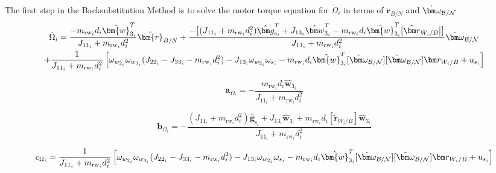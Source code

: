 The first step in the Backsubstitution Method is to solve the motor torque equation for $\dot{\Omega}_i$ in terms of $\ddot{\bm{r}}_{B/N}$ and $\dot{\bm\omega}_{\cal B/N}$
\begin{multline}
\dot{\Omega}_i
= \frac{-m_{\text{rw}_i} d_i \hat{\bm{w}}_{3_i}^T }{J_{11_i} + m_{\text{rw}_i} d_i^2}\ddot{\bm{r}}_{B/N} + \frac{-\big[(J_{11_i} + m_{\text{rw}_i} d_i^2)\hat{\bm g}_{\text{s}_i}^T  + J_{13_i}\hat{\bm w}_{3_i}^T -m_{\text{rw}_i} d_i \hat{\bm{w}}_{3_i}^T [\tilde{\bm r}_{W_i/B}]\big]}{J_{11_i} + m_{\text{rw}_i} d_i^2}\dot{\bm\omega}_{\cal B/N}
\\
+\frac{1}{J_{11_i} + m_{\text{rw}_i} d_i^2}\left[\omega_{w_{2_i}} \omega_{w_{3_i}} (J_{22_i} - J_{33_i} - m_{\text{rw}_i} d_i^2
)-J_{13_i} \omega_{w_{2_i}}\omega_{s_i} -m_{\text{rw}_i} d_i \hat{\bm{w}}_{3_i}^T [\tilde{\bm\omega}_{\cal B/N}] [\tilde{\bm\omega}_{\cal B/N}] \bm r_{W_i/B} + u_{s_i} \right]
\label{eq:motorTorqueFinal2}
\end{multline}

\begin{equation}
\bm{a}_{\Omega_i} = -\frac{m_{\text{rw}_i} d_i \hat{\bm{w}}_{3_i} }{J_{11_i} + m_{\text{rw}_i} d_i^2}
\end{equation}

\begin{equation}
\bm{b}_{\Omega_i} = -\frac{(J_{11_i} + m_{\text{rw}_i} d_i^2)\hat{\bm g}_{\text{s}_i}  + J_{13_i}\hat{\bm w}_{3_i} +m_{\text{rw}_i} d_i  [\tilde{\bm r}_{W_i/B}]\hat{\bm{w}}_{3_i}}{J_{11_i} + m_{\text{rw}_i} d_i^2}
\end{equation}

\begin{equation}
c_{\Omega_i} = \frac{1}{J_{11_i} + m_{\text{rw}_i} d_i^2}\left[\omega_{w_{2_i}} \omega_{w_{3_i}} (J_{22_i} - J_{33_i} - m_{\text{rw}_i} d_i^2
) - J_{13_i} \omega_{w_{2_i}}\omega_{s_i} -m_{\text{rw}_i} d_i \hat{\bm{w}}_{3_i}^T [\tilde{\bm\omega}_{\cal B/N}] [\tilde{\bm\omega}_{\cal B/N}] \bm r_{W_i/B} + u_{s_i} \right]
\end{equation}



